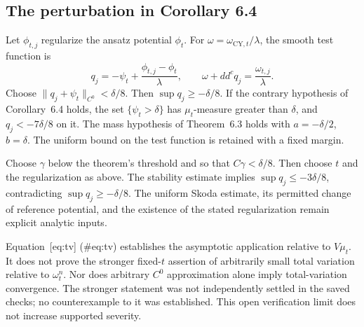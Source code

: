 \documentclass[10pt]{article}
\begin{document}
\subsection*{The perturbation in Corollary 6.4}
Let \(\phi_{t,j}\) regularize the ansatz potential \(\phi_t\). For \(\omega=\omega_{\mathrm{CY},t}/\lambda\), the smooth test function is \[q_j=-\psi_t+\frac{\phi_{t,j}-\phi_t}{\lambda},
 \qquad
 \omega+dd^cq_j=\frac{\omega_{t,j}}{\lambda}.\] Choose \(\|q_j+\psi_t\|_{C^0}<\delta/8\). Then \(\sup q_j\geq-\delta/8\). If the contrary hypothesis of Corollary 6.4 holds, the set \(\{\psi_t>\delta\}\) has \(\mu_t\)-measure greater than \(\delta\), and \(q_j<-7\delta/8\) on it. The mass hypothesis of Theorem 6.3 holds with \(a=-\delta/2\), \(b=\delta\). The uniform bound on the test function is retained with a fixed margin.\par
Choose \(\gamma\) below the theorem’s threshold and so that \(C\gamma<\delta/8\). Then choose \(t\) and the regularization as above. The stability estimate implies \(\sup q_j\leq-3\delta/8\), contradicting \(\sup q_j\geq-\delta/8\). The uniform Skoda estimate, its permitted change of reference potential, and the existence of the stated regularization remain explicit analytic inputs.\par
Equation [eq:tv] (\#eq:tv) establishes the asymptotic application relative to \(V\mu_t\). It does not prove the stronger fixed-\(t\) assertion of arbitrarily small total variation relative to \(\omega_t^n\). Nor does arbitrary \(C^0\) approximation alone imply total-variation convergence. The stronger statement was not independently settled in the saved checks; no counterexample to it was established. This open verification limit does not increase supported severity.\par
\end{document}
